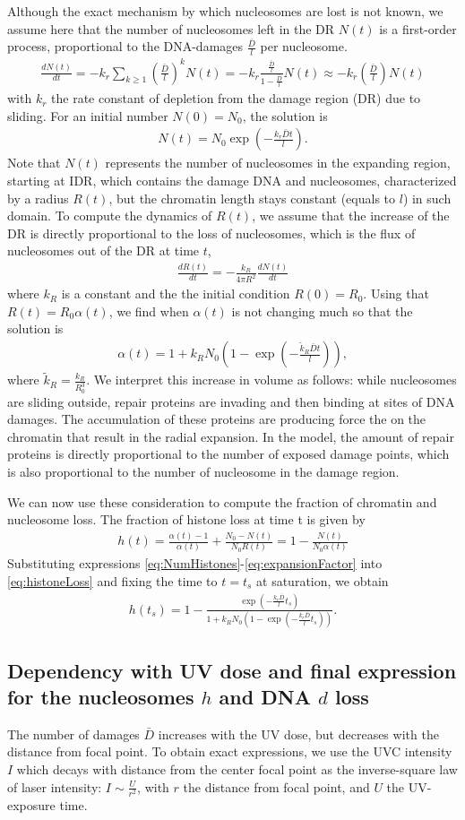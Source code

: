 \documentclass[12pt]{article}
\newcommand{\beq}{\begin{eqnarray}}
\newcommand{\eeq}{\end{eqnarray}}
\begin{document}
Although the exact mechanism by which nucleosomes are lost is not known, we assume here that the number of nucleosomes left in the DR $N(t)$ is a first-order process, proportional to the DNA-damages $\frac{\bar{D}}{l}$ per nucleosome.
\beq
\frac{dN(t)}{dt} = -k_r\sum_{k\geq 1} (\frac{\bar{D}}{l})^kN(t)=-k_r \frac{\frac{\bar{D}}{l}}{1-\frac{\bar{D}}{l}}N(t) \approx -k_r (\frac{\bar{D}}{l})N(t)
\eeq
with $k_r$ the rate constant of depletion from the damage region (DR) due to sliding. For an initial number $N(0) = N_0$, the solution is 
\beq\label{eq:NumHistones}
N(t) = N_0\exp(-\frac{k_r\bar{D}t}{l}).
\eeq
Note that $N(t)$ represents the number of nucleosomes in the expanding region, starting at IDR, which contains the damage DNA and nucleosomes, characterized by a radius $R(t)$, but the chromatin length stays constant (equals to $l$) in such domain. To compute the dynamics of $R(t)$, we assume that the increase of the DR is directly proportional to the loss of nucleosomes, which is the flux of nucleosomes out of the DR at time $t$,
\beq
\frac{dR(t)}{dt}=-\frac{k_R}{4\pi R^2}\frac{dN(t)}{dt}
\eeq
where $k_R $ is a constant and the the initial condition $R(0)=R_0$. Using that $R(t)=R_0 \alpha (t)$, we find when $\alpha(t)$ is not changing much so that the solution is
\beq\label{eq:expansionFactor}
\alpha(t) = 1+k_RN_0(1-\exp(-\frac{\tilde k_R\bar{D}t}{l})),
\eeq
where $\tilde k_R=\frac{k_R}{R_0^3}$. We interpret this increase in volume as follows: while nucleosomes are sliding outside, repair proteins are invading and then binding at sites of DNA damages. The accumulation of these proteins are producing force the on the chromatin that result in the radial expansion. In the model, the amount of repair proteins is directly proportional to the number of exposed damage points, which is also proportional to the number of nucleosome in the damage region.

We can now use these consideration to compute the fraction of chromatin and nucleosome loss. The fraction of histone loss at time t is given by
\beq\label{eq:histoneLoss}
h(t) = \frac{\alpha(t)-1}{\alpha(t)} +\frac{N_0-N(t)}{N_0R(t)}=1-\frac{N(t)}{N_0\alpha(t)}
\eeq
Substituting expressions \ref{eq:NumHistones}-\ref{eq:expansionFactor} into \ref{eq:histoneLoss} and fixing the time to $t=t_s$ at saturation, we obtain
\beq\label{eq:totalHistoneLoss}
h(t_s)=1-\frac{\exp(-\frac{k_r\bar{D}}{l}t_s)}{ 1+k_RN_0(1-\exp(-\frac{k_r\bar{D}}{l}t_s))}.
\eeq

\subsection{Dependency with UV dose and final expression for the nucleosomes $h$ and DNA $d$ loss}
The number of damages $\bar{D}$ increases with the UV dose, but decreases with the distance from focal point. To obtain exact expressions, we use  the UVC intensity $I$ which decays with distance from the center focal point as the inverse-square law of laser intensity: $I \sim \frac{U}{r^2}$, with $r$ the distance from focal point, and $U$ the UV-exposure time.
\end{document}
